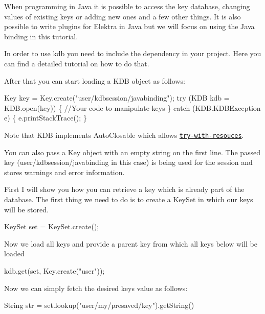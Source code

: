 When programming in Java it is possible to access the key database, changing values of existing keys or adding new ones and a few other things. It is also possible to write plugins for Elektra in Java but we will focus on using the Java binding in this tutorial.

In order to use {\ttfamily kdb} you need to include the dependency in your project. Here you can find a detailed tutorial on how to do that.

After that you can start loading a {\ttfamily K\+DB} object as follows\+:


\begin{DoxyCode}
Key key = Key.create(\textcolor{stringliteral}{"user/kdbsession/javabinding"});
\textcolor{keywordflow}{try} (KDB kdb = KDB.open(key)) \{
    \textcolor{comment}{//Your code to manipulate keys}
\} \textcolor{keywordflow}{catch} (KDB.KDBException e) \{
    e.printStackTrace();
\}
\end{DoxyCode}


Note that {\ttfamily K\+DB} implements {\ttfamily Auto\+Closable} which allows \href{https://docs.oracle.com/javase/tutorial/essential/exceptions/tryResourceClose.html}{\tt try-\/with-\/resouces}.

You can also pass a {\ttfamily Key} object with an empty string on the first line. The passed key ({\ttfamily user/kdbsession/javabinding} in this case) is being used for the session and stores warnings and error information.

First I will show you how you can retrieve a key which is already part of the database. The first thing we need to do is to create a {\ttfamily Key\+Set} in which our keys will be stored.


\begin{DoxyCode}
KeySet \textcolor{keyword}{set} = KeySet.create();
\end{DoxyCode}


Now we load all keys and provide a parent key from which all keys below will be loaded


\begin{DoxyCode}
kdb.get(\textcolor{keyword}{set}, Key.create(\textcolor{stringliteral}{"user"}));
\end{DoxyCode}


Now we can simply fetch the desired key\textquotesingle{}s value as follows\+:


\begin{DoxyCode}
String str = \textcolor{keyword}{set}.lookup(\textcolor{stringliteral}{"user/my/presaved/key"}).getString()
\end{DoxyCode}


